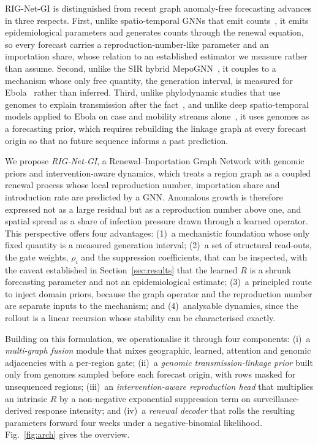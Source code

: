 \documentclass[conference]{IEEEtran}
\begin{document}
RIG-Net-GI is distinguished from recent graph anomaly-free forecasting advances in three respects. First, unlike spatio-temporal GNNs that emit counts~\cite{mtgnn,staeformer,stid}, it emits epidemiological parameters and generates counts through the renewal equation, so every forecast carries a reproduction-number-like parameter and an importation share, whose relation to an established estimator we measure rather than assume. Second, unlike the SIR hybrid MepoGNN~\cite{mepognn}, it couples to a mechanism whose only free quantity, the generation interval, is measured for Ebola~\cite{who2014} rather than inferred. Third, unlike phylodynamic studies that use genomes to explain transmission after the fact~\cite{dudas2017,kinganda2021}, and unlike deep spatio-temporal models applied to Ebola on case and mobility streams alone~\cite{deepevd,stflam}, it uses genomes as a forecasting prior, which requires rebuilding the linkage graph at every forecast origin so that no future sequence informs a past prediction.

We propose \textit{RIG-Net-GI}, a Renewal--Importation Graph Network with genomic priors and intervention-aware dynamics, which treats a region graph as a coupled renewal process whose local reproduction number, importation share and introduction rate are predicted by a GNN. Anomalous growth is therefore expressed not as a large residual but as a reproduction number above one, and spatial spread as a share of infection pressure drawn through a learned operator. This perspective offers four advantages: (1)~a mechanistic foundation whose only fixed quantity is a measured generation interval; (2)~a set of structural read-outs, the gate weights, $\rho_i$ and the suppression coefficients, that can be inspected, with the caveat established in Section~\ref{sec:results} that the learned $R$ is a shrunk forecasting parameter and not an epidemiological estimate; (3)~a principled route to inject domain priors, because the graph operator and the reproduction number are separate inputs to the mechanism; and (4)~analysable dynamics, since the rollout is a linear recursion whose stability can be characterised exactly.

Building on this formulation, we operationalise it through four components: (i)~a \textit{multi-graph fusion} module that mixes geographic, learned, attention and genomic adjacencies with a per-region gate; (ii)~a \textit{genomic transmission-linkage prior} built only from genomes sampled before each forecast origin, with rows masked for unsequenced regions; (iii)~an \textit{intervention-aware reproduction head} that multiplies an intrinsic $R$ by a non-negative exponential suppression term on surveillance-derived response intensity; and (iv)~a \textit{renewal decoder} that rolls the resulting parameters forward four weeks under a negative-binomial likelihood. Fig.~\ref{fig:arch} gives the overview.
\end{document}
